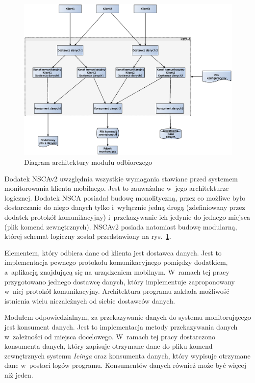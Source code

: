 \begin{figure}[ht]
  \caption{Diagram architektury modułu odbiorczego}
  \label{fig:odbiorczy}
  \centering
\includegraphics[width=1\textwidth]{img/odbiorczy}
\end{figure}

Dodatek NSCAv2 uwzględnia wszystkie wymagania stawiane przed systemem
monitorowania klienta mobilnego. Jest to zauważalne w~jego
architekturze logicznej. Dodatek NSCA posiadał budowę monolityczną,
przez co możliwe było dostarczanie do niego danych tylko i~wyłącznie
jedną drogą (zdefiniowany przez dodatek protokół komunikacyjny)
i~przekazywanie ich jedynie do jednego miejsca (plik komend
zewnętrznych). NSCAv2 posiada natomiast budowę modularną, której
schemat logiczny został przedstawiony na rys.~\ref{fig:odbiorczy}.

Elementem, który odbiera dane od klienta jest dostawca danych. Jest to
implementacja pewnego protokołu komunikacyjnego pomiędzy dodatkiem,
a~aplikacją znajdującą się na urządzeniem mobilnym. W~ramach tej pracy
przygotowano jednego dostawcę danych, który implementuje zaproponowany
w~niej protokół komunikacyjny. Architektura programu zakłada możliwość
istnienia wielu niezależnych od siebie dostawców danych.

Modułem odpowiedzialnym, za przekazywanie danych do systemu
monitorującego jest konsument danych. Jest to implementacja metody
przekazywania danych w~zależności od miejsca docelowego. W~ramach tej
pracy dostarczono konsumenta danych, który zapisuje otrzymane dane do
pliku komend zewnętrznych systemu {\em Icinga} oraz konsumenta danych, który
wypisuje otrzymane dane w~postaci logów programu. Konsumentów danych
również może być więcej niż jeden.

